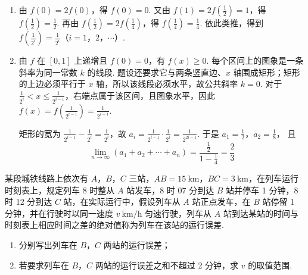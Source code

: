 \begin{solution}
\begin{enumerate}
\item 由 \(f(0)=2f(0)\)，得 \(f(0)=0\). 又由
\(f(1)=2f\left(\frac{1}{2}\right)=1\)，得
\(f\left(\frac{1}{2}\right)=\frac{1}{2}\). 再由
\(f\left(\frac{1}{2}\right)=2f\left(\frac{1}{4}\right)\)，得
\(f\left(\frac{1}{4}\right)=\frac{1}{4}\). 依此类推，得到
\(f\left(\frac{1}{2^{i}}\right)=\frac{1}{2^{i}}\)（\(i=1\)，\(2\)，\(\cdots\)）.

\item
由 \(f\) 在 \([0,1]\) 上递增且 \(f(0)=0\)，有 \(f(x)\geqslant0\). 每个区间上的图象是一条斜率为同一常数 \(k\) 的线段. 题设还要求它与两条竖直边、\(x\) 轴围成矩形；矩形的上边必须平行于 \(x\) 轴，所以该线段必须水平，故公共斜率 \(k=0\). 对于
\(\frac{1}{2^{i}}<x\leqslant\frac{1}{2^{i-1}}\)，右端点属于该区间，且图象水平，因此
\(f(x)=f\left(\frac{1}{2^{i-1}}\right)=\frac{1}{2^{i-1}}\).

矩形的宽为
\(\frac{1}{2^{i-1}}-\frac{1}{2^{i}}=\frac{1}{2^{i}}\)，故
\(a_{i}=\frac{1}{2^{i-1}}\cdot\frac{1}{2^{i}}=\frac{1}{2^{2i-1}}\).
于是 \(a_{1}=\frac{1}{2}\)，\(a_{2}=\frac{1}{8}\)，
且
\[
\lim_{n\to\infty}(a_{1}+a_{2}+\cdots+a_{n})
=\frac{\frac{1}{2}}{1-\frac{1}{4}}=\frac{2}{3}
\]
\end{enumerate}
\end{solution}

\begin{problem}
某段城铁线路上依次有 \(A\)，\(B\)，\(C\) 三站，\(AB=15\mathrm{~km}\)，\(BC=3\mathrm{~km}\)，在列车运行时刻表上，规定列车 8 时整从 \(A\) 站发车，8 时 07 分到达 \(B\) 站并停车 1 分钟，8 时 12 分到达 \(C\) 站，在实际运行中，假设列车从 \(A\) 站正点发车，在 \(B\) 站停留 1 分钟，并在行驶时以同一速度 \(v\mathrm{~km}/\mathrm{h}\) 匀速行驶，列车从 \(A\) 站到达某站的时间与时刻表上相应时间之差的绝对值称为列车在该站的运行误差.

\begin{enumerate}
\item 分别写出列车在 \(B\)，\(C\) 两站的运行误差；
\item 若要求列车在 \(B\)，\(C\) 两站的运行误差之和不超过 2 分钟，求 \(v\) 的取值范围.
\end{enumerate}
\end{problem}

